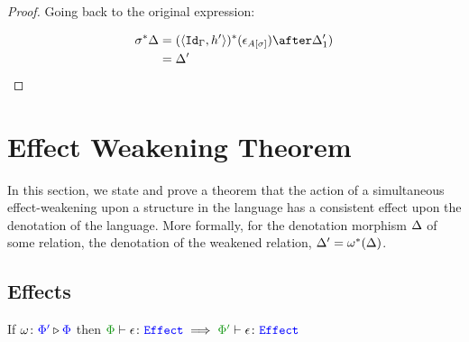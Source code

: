 \documentclass{report}
\begin{document}
\begin{framed}
\begin{proof}
    Going back to the original expression:
    
    \begin{align*}
        \si\star{\D} & = (\pr{\Id{\G}}{h'})\star(\e_{A\ssi})\after\D_1')\\
        & = \D'\\
    \end{align*}
    
    \end{proof}
    
\end{framed}

\chapter{Effect Weakening Theorem}
In this section, we state and prove a theorem that the action of a simultaneous effect-weakening upon a structure in the language has a consistent effect upon the denotation of the language. More formally, for the denotation morphism $\Delta$ of some relation, the denotation of the weakened relation, $\Delta' = \omega^*(\Delta)$.
   
\section{Effects}

\begin{theorem}
    If $\omega \colon {\color{blue}\Phi'} \triangleright {\color {blue} \Phi}$ then $\wellformede{\P}{\e}\implies\wellformede{\P'}{\e}$ 
\end{theorem}
\end{document}
